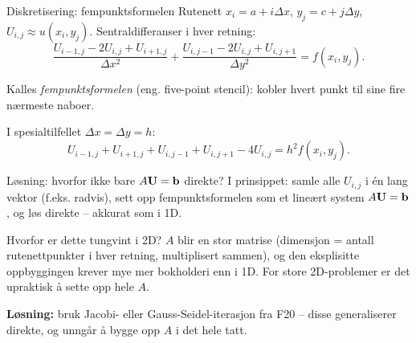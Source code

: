 \documentclass[11pt,aspectratio=169]{beamer}
\begin{document}
\begin{frame}{Diskretisering: fempunktsformelen}
Rutenett $x_i=a+i\Delta x$, $y_j=c+j\Delta y$, $U_{i,j}\approx u(x_i,y_j)$. Sentraldifferanser i hver retning:
\[
\frac{U_{i-1,j}-2U_{i,j}+U_{i+1,j}}{\Delta x^2} + \frac{U_{i,j-1}-2U_{i,j}+U_{i,j+1}}{\Delta y^2} = f(x_i,y_j).
\]
\begin{center}
\end{center}
Kalles \emph{fempunktsformelen} (eng. five-point stencil): kobler hvert punkt til sine fire nærmeste naboer.

I spesialtilfellet $\Delta x=\Delta y=h$:
\begin{equation}
U_{i-1,j}+U_{i+1,j}+U_{i,j-1}+U_{i,j+1} - 4U_{i,j} = h^2f(x_i,y_j).
\end{equation}
\end{frame}

\begin{frame}{Løsning: hvorfor ikke bare $A\mathbf{U}=\mathbf{b}$ direkte?}
I prinsippet: samle alle $U_{i,j}$ i én lang vektor (f.eks. radvis), sett opp fempunktsformelen som et lineært system $A\mathbf{U}=\mathbf{b}$, og løs direkte -- akkurat som i 1D.
\begin{remb}{Hvorfor er dette tungvint i 2D?}
$A$ blir en stor matrise (dimensjon = antall rutenettpunkter i hver retning, multiplisert sammen), og den eksplisitte oppbyggingen krever mye mer bokholderi enn i 1D. For store 2D-problemer er det upraktisk å sette opp hele $A$.
\end{remb}
\textbf{Løsning:} bruk Jacobi- eller Gauss-Seidel-iterasjon fra F20 -- disse generaliserer direkte, og unngår å bygge opp $A$ i det hele tatt.
\end{frame}
\end{document}
